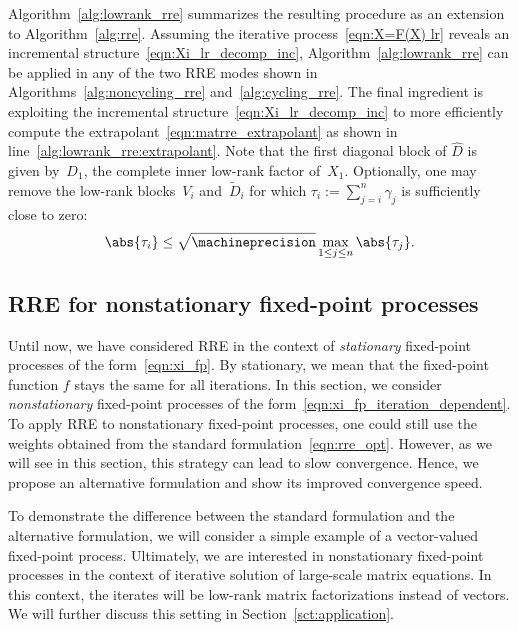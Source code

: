 Algorithm~\ref{alg:lowrank_rre} summarizes the resulting procedure as an extension to Algorithm~\ref{alg:rre}.
Assuming the iterative process~\eqref{eqn:X=F(X) lr} reveals an incremental structure~\eqref{eqn:Xi_lr_decomp_inc},
Algorithm~\ref{alg:lowrank_rre} can be applied in any of the two \ac{RRE} modes shown in Algorithms~\ref{alg:noncycling_rre} and~\ref{alg:cycling_rre}.
The final ingredient is exploiting the incremental structure~\eqref{eqn:Xi_lr_decomp_inc}
to more efficiently compute the extrapolant~\eqref{eqn:matrre_extrapolant}
as shown in line~\ref{alg:lowrank_rre:extrapolant}.
Note that the first diagonal block of $\widehat{D}$
is given by~$D_1$,
the complete inner low-rank factor of~$X_1$.
Optionally,
one may remove the low-rank blocks~$V_i$ and~$\tilde D_i$ for which
$\tau_i := \sum_{j=i}^n \gamma_j$ is sufficiently close to zero:
\begin{equation}
	\abs{\tau_i}
	\leq \sqrt{\machineprecision} \max_{1\leq j\leq n} \abs{\tau_j}
	.
\end{equation}

\subsection{RRE for nonstationary fixed-point processes}\label{sct:flexible_rre}

Until now, we have considered \ac{RRE} in the context of \emph{stationary} fixed-point processes of the form~\eqref{eqn:xi_fp}.
By stationary, we mean that the fixed-point function $f$ stays the same for all iterations.
In this section, we consider \emph{nonstationary} fixed-point processes of the form~\eqref{eqn:xi_fp_iteration_dependent}.
To apply \ac{RRE} to nonstationary fixed-point processes, one could still use the weights obtained from the standard formulation~\eqref{eqn:rre_opt}.
However, as we will see in this section, this strategy can lead to slow convergence.
Hence, we propose an alternative formulation and show its improved convergence speed.

To demonstrate the difference between the standard formulation and the alternative formulation, we will consider a simple example of a vector-valued fixed-point process.
Ultimately, we are interested in nonstationary fixed-point processes in the context of iterative solution of large-scale matrix equations.
In this context, the iterates will be low-rank matrix factorizations instead of vectors.
We will further discuss this setting in Section~\ref{sct:application}.

